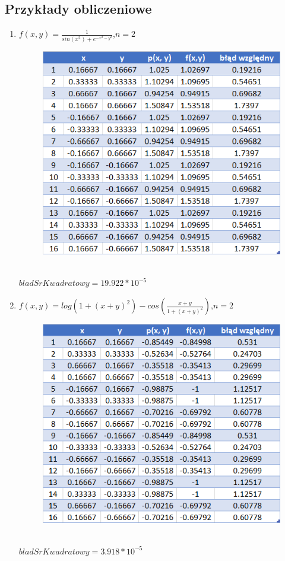 \documentclass[12pt, leqno]{article}
\begin{document}
        \subsection*{Przykłady obliczeniowe}
        \begin{enumerate}
            \large
            \item{$f(x, y) = \frac{1}{sin(x^2) + e^{-x^2 - y^2}}$,\quad $n = 2$}
            \begin{figure}[!h]
                \includegraphics[width=\linewidth]{func1.png}
            \end{figure}\\
            $bladSrKwadratowy = 19.922 * 10^{-5}$

            \newpage
            \large
            \item{$f(x, y) = log(1 + (x + y)^2) - cos(\frac{x+y}{1 + (x+y)^2})$,\quad $n = 2$}
            \begin{figure}[!h]
                \includegraphics[width=\linewidth]{func2.png}
            \end{figure}\\
            $bladSrKwadratowy = 3.918 * 10^{-5}$


\end{enumerate}
\end{document}
